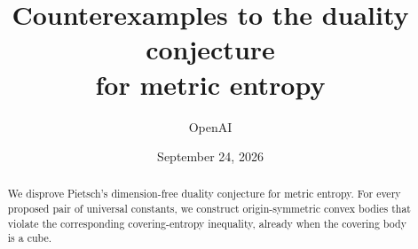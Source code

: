 \documentclass[11pt]{article}
\title{Counterexamples to the duality conjecture\\for metric entropy}
\author{OpenAI}
\date{September 24, 2026}
\begin{document}
\maketitle
\begin{abstract}
We disprove Pietsch's dimension-free duality conjecture for metric entropy.
For every proposed pair of universal constants, we construct
origin-symmetric convex bodies that violate the corresponding covering-entropy
inequality, already when the covering body is a cube.
\end{abstract}






\begingroup
\raggedright

\endgroup
\end{document}
